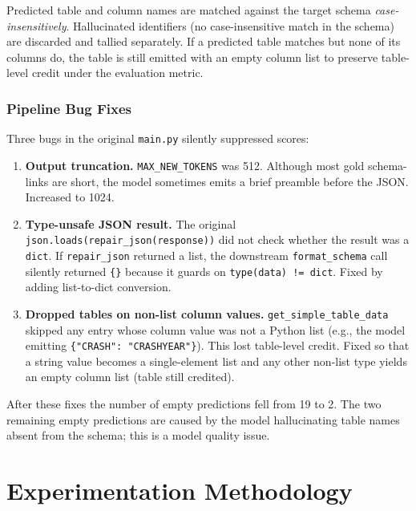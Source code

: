 \documentclass[11pt,letterpaper]{article}
\begin{document}
Predicted table and column names are matched against the target schema
\emph{case-insensitively}.
Hallucinated identifiers (no case-insensitive match in the schema) are
discarded and tallied separately.
If a predicted table matches but none of its columns do, the table is still
emitted with an empty column list to preserve table-level credit under the
evaluation metric.

\subsubsection{Pipeline Bug Fixes}

Three bugs in the original \texttt{main.py} silently suppressed scores:

\begin{enumerate}[leftmargin=*,noitemsep]
  \item \textbf{Output truncation.}
        \texttt{MAX\_NEW\_TOKENS} was 512.
        Although most gold schema-links are short, the model sometimes emits a
        brief preamble before the JSON.
        Increased to 1024.

  \item \textbf{Type-unsafe JSON result.}
        The original \texttt{json.loads(repair\_json(response))} did not check
        whether the result was a \texttt{dict}.
        If \texttt{repair\_json} returned a list, the downstream
        \texttt{format\_schema} call silently returned \texttt{\{\}} because it
        guards on \texttt{type(data) != dict}.
        Fixed by adding list-to-dict conversion.

  \item \textbf{Dropped tables on non-list column values.}
        \texttt{get\_simple\_table\_data} skipped any entry whose column value
        was not a Python list (e.g., the model emitting
        \texttt{\{"CRASH": "CRASHYEAR"\}}).
        This lost table-level credit.
        Fixed so that a string value becomes a single-element list and any
        other non-list type yields an empty column list (table still credited).
\end{enumerate}

After these fixes the number of empty predictions fell from 19 to 2.
The two remaining empty predictions are caused by the model hallucinating
table names absent from the schema; this is a model quality issue.

\section{Experimentation Methodology}
\label{sec:exp}
\end{document}
